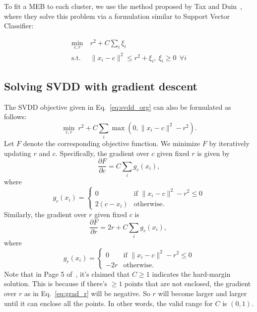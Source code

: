\documentclass[12pt]{article}
\begin{document}
To fit a MEB to each cluster, we use the method proposed by Tax and Duin~\cite{tax04}, where they solve this problem via a formulation similar to Support Vector Classifier:

\begin{align}
\min_{c,r} ~& r^2 + C\sum_i \xi_i \nonumber\\
\text{s.t.} ~& \| x_i - c \|^2 \le r^2 + \xi_i, ~\xi_i \ge 0~ ~\forall i
\label{eq:svdd_org}
\end{align}

\subsection{Solving SVDD with gradient descent}
The SVDD objective given in Eq.~\ref{eq:svdd_org} can also be formulated as follows:
\begin{equation}
\min_{c,r} ~r^2 + C\sum_i \max(0, \| x_i - c\|^2 - r^2).
\end{equation}
Let $F$ denote the corresponding objective function. We minimize $F$ by iteratively updating $r$ and $c$. Specifically, the gradient over $c$ given fixed $r$ is given by
$$
\frac{\partial F}{\partial c} = C\sum_i g_c(x_i),
$$
where
$$
g_c(x_i) =
  \begin{cases}
   0 & \text{if } \| x_i - c\|^2 - r^2 \le 0  \\
   2(c - x_i) & \text{otherwise}.
  \end{cases}
$$
Similarly, the gradient over $r$ given fixed $c$ is 
$$
\frac{\partial F}{\partial r} = 2r + C\sum_i g_r(x_i),~\label{eq:grad_r}
$$
where
$$
g_r(x_i) =
  \begin{cases}
   0 & \text{if } \| x_i - c\|^2 - r^2 \le 0  \\
   -2r & \text{otherwise}.
  \end{cases}
$$
Note that in Page 5 of~\cite{tax04}, it's claimed that $C \ge 1$ indicates the hard-margin solution. This is because if there's $\ge 1$ points that are not enclosed, the gradient over $r$ as in Eq.~\ref{eq:grad_r} will be negative. So $r$ will become larger and larger until it can enclose all the points. In other words, the valid range for $C$ is $(0, 1)$.
\end{document}
